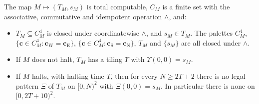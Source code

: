 \begin{proposition}\label{prop:horn}
The map $M\mapsto(T_M,s_M)$ is total computable, $C_M$ is a finite set with the associative, commutative and idempotent operation $\wedge$, and:
\begin{itemize}
\item[(a)] $T_M\subseteq C_M^4$ is closed under coordinatewise $\wedge$, and $s_M\in T_M$. The palettes $C_M^4$, $\{\mathbf c\in C_M^4:\mathbf c_{\mathrm W}=\mathbf c_{\mathrm E}\}$, $\{\mathbf c\in C_M^4:\mathbf c_{\mathrm S}=\mathbf c_{\mathrm N}\}$, $T_M$ and $\{s_M\}$ are all closed under $\wedge$.
\item[(b)] If $M$ does not halt, $T_M$ has a tiling $\Upsilon$ with $\Upsilon(0,0)=s_M$.
\item[(c)] If $M$ halts, with halting time $T$, then for every $N\ge2T+2$ there is no legal pattern $\Xi$ of $T_M$ on $[0,N)^2$ with $\Xi(0,0)=s_M$. In particular there is none on $[0,2T+10)^2$.
\end{itemize}
\end{proposition}

